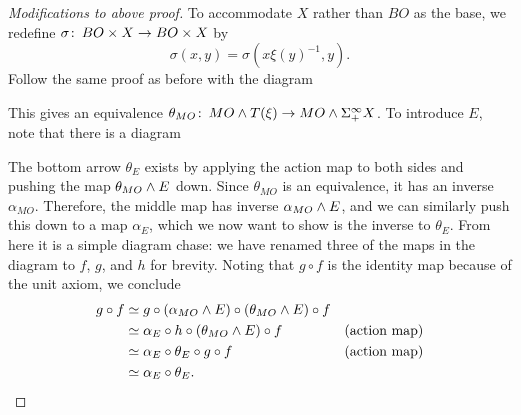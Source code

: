 \begin{proof}[Modifications to above proof]
To accommodate $X$ rather than $BO$ as the base, we redefine $\sigma\colon\thinspace BO \times X \to BO \times X$ by \[\sigma(x, y) = \sigma(x \xi(y)^{-1}, y).\]  Follow the same proof as before with the diagram
\begin{center}
\end{center}
This gives an equivalence $\theta_{MO}\colon\thinspace MO \wedge T(\xi) \rightarrow MO \wedge \Sigma^\infty_+ X$.  To introduce $E$, note that there is a diagram
\begin{center}
\end{center}
The bottom arrow $\theta_E$ exists by applying the action map to both sides and pushing the map $\theta_{MO} \wedge E$ down.  Since $\theta_{MO}$ is an equivalence, it has an inverse $\alpha_{MO}$.  Therefore, the middle map has inverse $\alpha_{MO} \wedge E$, and we can similarly push this down to a map $\alpha_E$, which we now want to show is the inverse to $\theta_E$.  From here it is a simple diagram chase: we have renamed three of the maps in the diagram to $f$, $g$, and $h$ for brevity.  Noting that $g \circ f$ is the identity map because of the unit axiom, we conclude
\begin{align*}
g\circ f &\simeq g \circ (\alpha_{MO}\wedge E) \circ (\theta_{MO} \wedge E) \circ f& \\
& \simeq \alpha_E \circ h \circ (\theta_{MO}\wedge E) \circ f & \text{(action map)}\\
& \simeq \alpha_E \circ \theta_E \circ g \circ f & \text{(action map)}\\
&\simeq \alpha_E \circ \theta_E. & \qedhere
\end{align*}
\end{proof}

